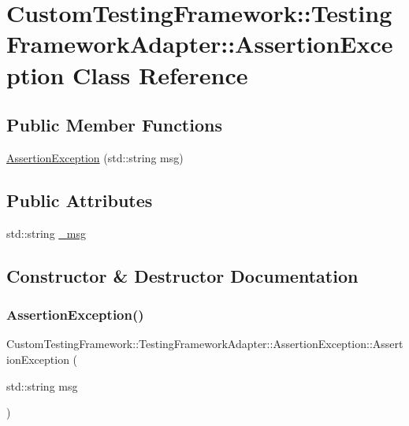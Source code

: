 \hypertarget{classCustomTestingFramework_1_1TestingFrameworkAdapter_1_1AssertionException}{}\section{Custom\+Testing\+Framework\+::Testing\+Framework\+Adapter\+::Assertion\+Exception Class Reference}
\label{classCustomTestingFramework_1_1TestingFrameworkAdapter_1_1AssertionException}
\subsection*{Public Member Functions}
\begin{DoxyCompactItemize}
\item 
\mbox{\hyperlink{classCustomTestingFramework_1_1TestingFrameworkAdapter_1_1AssertionException_ae56fb4048c78b12e3b3ace141d6da2f2}{Assertion\+Exception}} (std\+::string msg)
\end{DoxyCompactItemize}
\subsection*{Public Attributes}
\begin{DoxyCompactItemize}
\item 
std\+::string \mbox{\hyperlink{classCustomTestingFramework_1_1TestingFrameworkAdapter_1_1AssertionException_ae7e5ceab1ae1c2c80391819342c3e044}{\+\_\+msg}}
\end{DoxyCompactItemize}


\subsection{Constructor \& Destructor Documentation}
\mbox{\label{classCustomTestingFramework_1_1TestingFrameworkAdapter_1_1AssertionException_ae56fb4048c78b12e3b3ace141d6da2f2}} 
\subsubsection{\texorpdfstring{AssertionException()}{AssertionException()}}
{\footnotesize\ttfamily Custom\+Testing\+Framework\+::\+Testing\+Framework\+Adapter\+::\+Assertion\+Exception\+::\+Assertion\+Exception (\begin{DoxyParamCaption}\item[{std\+::string}]{msg }\end{DoxyParamCaption})\hspace{0.3cm}{\ttfamily [inline]}}



